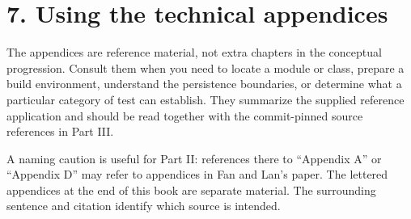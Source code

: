 \section*{7. Using the technical appendices}

The appendices are reference material, not extra chapters in the conceptual progression. Consult them when you need to locate a module or class, prepare a build environment, understand the persistence boundaries, or determine what a particular category of test can establish. They summarize the supplied reference application and should be read together with the commit-pinned source references in Part III.

A naming caution is useful for Part II: references there to ``Appendix A'' or ``Appendix D'' may refer to appendices in Fan and Lan's paper. The lettered appendices at the end of this book are separate material. The surrounding sentence and citation identify which source is intended.
